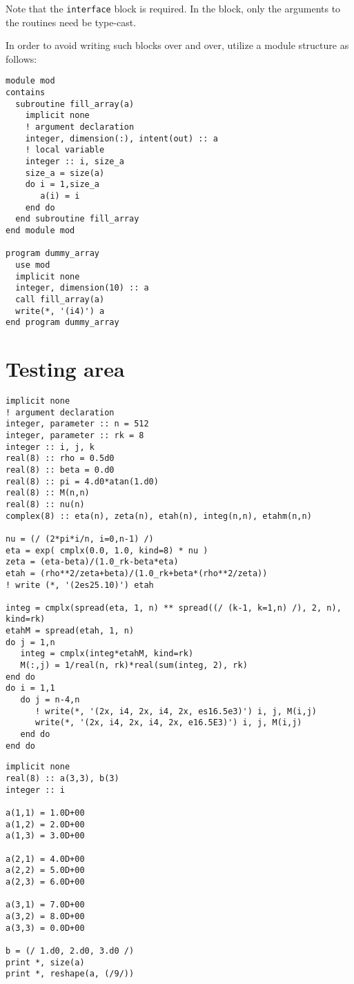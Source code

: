 \documentclass[11pt]{article}
\begin{document}
Note that the \texttt{interface} block is required. In the block, only the arguments to the routines need be type-cast.

In order to avoid writing such blocks over and over, utilize a module structure as follows:
\begin{verbatim}
module mod
contains
  subroutine fill_array(a)
    implicit none
    ! argument declaration
    integer, dimension(:), intent(out) :: a
    ! local variable
    integer :: i, size_a
    size_a = size(a)
    do i = 1,size_a
       a(i) = i
    end do
  end subroutine fill_array
end module mod

program dummy_array
  use mod
  implicit none
  integer, dimension(10) :: a
  call fill_array(a)
  write(*, '(i4)') a
end program dummy_array
\end{verbatim}

\section{Testing area}
\label{sec:org311825d}
\begin{verbatim}
implicit none
! argument declaration
integer, parameter :: n = 512
integer, parameter :: rk = 8
integer :: i, j, k
real(8) :: rho = 0.5d0
real(8) :: beta = 0.d0
real(8) :: pi = 4.d0*atan(1.d0)
real(8) :: M(n,n)
real(8) :: nu(n)
complex(8) :: eta(n), zeta(n), etah(n), integ(n,n), etahm(n,n)

nu = (/ (2*pi*i/n, i=0,n-1) /)
eta = exp( cmplx(0.0, 1.0, kind=8) * nu )
zeta = (eta-beta)/(1.0_rk-beta*eta)
etah = (rho**2/zeta+beta)/(1.0_rk+beta*(rho**2/zeta))
! write (*, '(2es25.10)') etah

integ = cmplx(spread(eta, 1, n) ** spread((/ (k-1, k=1,n) /), 2, n), kind=rk)
etahM = spread(etah, 1, n)
do j = 1,n
   integ = cmplx(integ*etahM, kind=rk)
   M(:,j) = 1/real(n, rk)*real(sum(integ, 2), rk)
end do
do i = 1,1
   do j = n-4,n
      ! write(*, '(2x, i4, 2x, i4, 2x, es16.5e3)') i, j, M(i,j)
      write(*, '(2x, i4, 2x, i4, 2x, e16.5E3)') i, j, M(i,j)
   end do
end do
\end{verbatim}

\begin{verbatim}
implicit none
real(8) :: a(3,3), b(3)
integer :: i

a(1,1) = 1.0D+00
a(1,2) = 2.0D+00
a(1,3) = 3.0D+00

a(2,1) = 4.0D+00
a(2,2) = 5.0D+00
a(2,3) = 6.0D+00

a(3,1) = 7.0D+00
a(3,2) = 8.0D+00
a(3,3) = 0.0D+00

b = (/ 1.d0, 2.d0, 3.d0 /)
print *, size(a)
print *, reshape(a, (/9/))
\end{verbatim}
\end{document}
